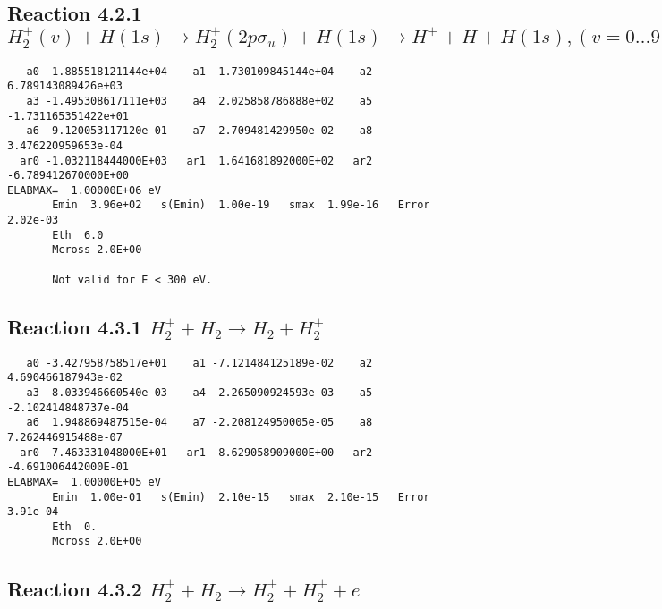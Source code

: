 \documentclass[12pt,dvipdfmx]{article}
\begin{document}
\newpage
\subsection{
Reaction 4.2.1 $H_2^+(v) + H(1s) \rightarrow H_2^+(2p\sigma_u) + H(1s) \rightarrow H^+ + H + H(1s), (v=0\ldots 9)$}












\begin{small}\begin{verbatim}
   a0  1.885518121144e+04    a1 -1.730109845144e+04    a2  6.789143089426e+03
   a3 -1.495308617111e+03    a4  2.025858786888e+02    a5 -1.731165351422e+01
   a6  9.120053117120e-01    a7 -2.709481429950e-02    a8  3.476220959653e-04
  ar0 -1.032118444000E+03   ar1  1.641681892000E+02   ar2 -6.789412670000E+00
ELABMAX=  1.00000E+06 eV
       Emin  3.96e+02   s(Emin)  1.00e-19   smax  1.99e-16   Error  2.02e-03
       Eth  6.0
       Mcross 2.0E+00

       Not valid for E < 300 eV.
\end{verbatim}\end{small}

\newpage
\subsection{
Reaction 4.3.1 $   H_2^+ + H_2 \rightarrow H_2 + H_2^+$}


\begin{small}\begin{verbatim}
   a0 -3.427958758517e+01    a1 -7.121484125189e-02    a2  4.690466187943e-02
   a3 -8.033946660540e-03    a4 -2.265090924593e-03    a5 -2.102414848737e-04
   a6  1.948869487515e-04    a7 -2.208124950005e-05    a8  7.262446915488e-07
  ar0 -7.463331048000E+01   ar1  8.629058909000E+00   ar2 -4.691006442000E-01
ELABMAX=  1.00000E+05 eV
       Emin  1.00e-01   s(Emin)  2.10e-15   smax  2.10e-15   Error  3.91e-04
       Eth  0.
       Mcross 2.0E+00
\end{verbatim}\end{small}

\newpage
\subsection{
Reaction 4.3.2 $   H_2^+ + H_2 \rightarrow H_2^+ + H_2^+ + e$}
\end{document}
